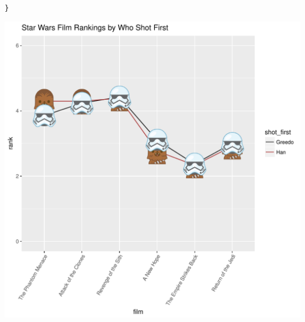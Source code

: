 \documentclass{article}\usepackage[]{graphicx}\usepackage[]{color}
\makeatletter
\def\maxwidth{ %
  \ifdim\Gin@nat@width>\linewidth
    \linewidth
  \else
    \Gin@nat@width
  \fi
}
\newcommand{\hlstd}[1]{\textcolor[rgb]{0.345,0.345,0.345}{#1}}%
\newenvironment{kframe}{%
 \def\at@end@of@kframe{}%
 \ifinner\ifhmode%
  \def\at@end@of@kframe{\end{minipage}}%
  \begin{minipage}{\columnwidth}%
 \fi\fi%
 \def\FrameCommand##1{\hskip\@totalleftmargin \hskip-\fboxsep
 \colorbox{shadecolor}{##1}\hskip-\fboxsep
     \hskip-\linewidth \hskip-\@totalleftmargin \hskip\columnwidth}%
 \MakeFramed {\advance\hsize-\width
   \@totalleftmargin\z@ \linewidth\hsize
   \@setminipage}}%
 {\par\unskip\endMakeFramed%
 \at@end@of@kframe}
\newenvironment{knitrout}{}{} %
\makeatother
\begin{document}
\begin{knitrout}
\begin{kframe}
\begin{alltt}
\hlstd{\}}
\end{alltt}
\end{kframe}
\includegraphics[width=\maxwidth]{figure/unnamed-chunk-1-1} 

\end{knitrout}
\end{document}
